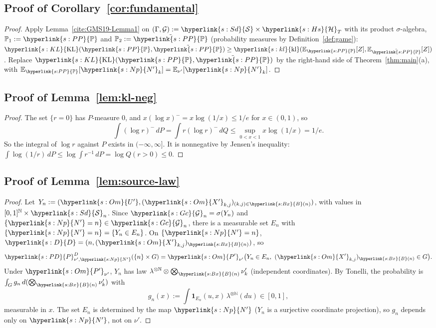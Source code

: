 \documentclass[11pt]{article}
\newcommand{\sy}[2]{\hyperlink{#1}{#2}}
\newcommand{\E}{\mathbb{E}}
\newcommand{\PP}{\sy{s:PP}{\mathbb{P}}}
\newcommand{\KL}{\sy{s:KL}{\mathrm{KL}}}
\newcommand{\kl}{\sy{s:kl}{\mathrm{kl}}}
\newcommand{\N}{\mathbb{N}}
\newcommand{\ind}{\mathbf{1}}
\newcommand{\Sd}{\sy{s:Sd}{\mathcal{S}}}
\newcommand{\Gc}{\sy{s:Gc}{\mathcal{G}}}
\newcommand{\Bx}{\sy{s:Bx}{B}}
\newcommand{\Hs}{\sy{s:Hs}{\mathcal{H}}}
\newcommand{\Np}{\sy{s:Np}{N'}}
\newcommand{\Dd}{\sy{s:D}{D}}
\newcommand{\PD}{\sy{s:PD}{P}^{D}}
\newcommand{\Up}{\sy{s:Om}{U'}}
\newcommand{\Xp}{\sy{s:Om}{X'}}
\newcommand{\Pp}{\sy{s:Om}{P'}}
\begin{document}
\subsection{Proof of Corollary~\ref{cor:fundamental}}\label{sec:proof-cor}

\begin{proof}
Apply Lemma~\ref{cite:GMS19-Lemma1} on $(\Gamma,\mathcal G):=\Sd\times\Hs_T$ with its product
$\sigma$-algebra, $\mathbb P_1:=\PP$ and $\mathbb P_2:=\tilde\PP$ (probability measures by
Definition~\ref{def:game}): $\KL(\PP,\tilde\PP)\ge\kl(\E_{\PP}[Z],\E_{\tilde\PP}[Z])$. Replace
$\KL(\PP,\tilde\PP)$ by the right-hand side of Theorem~\ref{thm:main}(a), with
$\E_{\PP}[\Np_k]=\E_{\nu'}[\Np_k]$.
\end{proof}

\subsection{Proof of Lemma~\ref{lem:kl-neg}}\label{sec:proof-kl-neg}

\begin{proof}
The set $\{r=0\}$ has $P$-measure $0$, and $x(\log x)^-=x\log(1/x)\le1/e$ for $x\in(0,1)$, so
\begin{equation*}
\int(\log r)^-\,dP=\int r(\log r)^-\,dQ\le\sup_{0<x<1}x\log(1/x)=1/e.
\end{equation*}
So the integral of $\log r$ against $P$ exists in $(-\infty,\infty]$. It is nonnegative by Jensen's
inequality: $\int\log(1/r)\,dP\le\log\int r^{-1}\,dP=\log Q(r>0)\le0$.
\end{proof}

\subsection{Proof of Lemma~\ref{lem:source-law}}\label{sec:proof-source-law}

\begin{proof}
Let $Y_n:=(\Up,(\Xp_{k,j})_{(k,j)\in\Bx(n)})$, with values in $[0,1]^{\N}\times\Sd_n$. Since
$\Gc_n=\sigma(Y_n)$ and $\{\Np=n\}\in\Gc_n$, there is a measurable set $E_n$ with
$\{\Np=n\}=\{Y_n\in E_n\}$. On $\{\Np=n\}$, $\Dd=(n,(\Xp_{k,j})_{\Bx(n)})$, so
\begin{equation*}
\PD_{\nu',\Np}(\{n\}\times G)=\Pp_{\nu'}\big(Y_n\in E_n,\ (\Xp_{k,j})_{\Bx(n)}\in G\big).
\end{equation*}
Under $\Pp_{\nu'}$, $Y_n$ has law $\lambda^{\otimes\N}\otimes\bigotimes_{\Bx(n)}\nu'_k$ (independent
coordinates). By Tonelli, the probability is $\int_G g_n\,d(\bigotimes_{\Bx(n)}\nu'_k)$ with
\begin{equation*}
g_n(x):=\int\ind_{E_n}(u,x)\,\lambda^{\otimes\N}(du)\in[0,1],
\end{equation*}
measurable in $x$. The set $E_n$ is determined by the map $\Np$ ($Y_n$ is a surjective coordinate
projection), so $g_n$ depends only on $\Np$, not on $\nu'$.
\end{proof}
\end{document}
